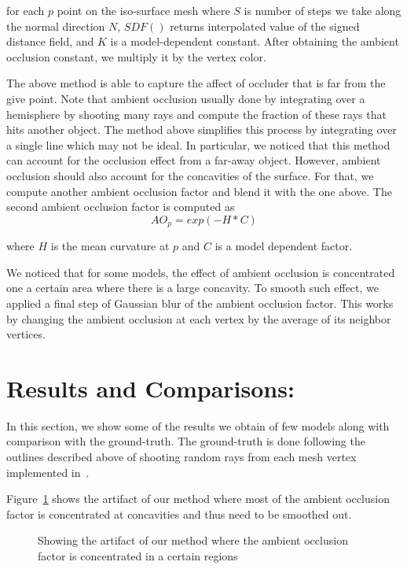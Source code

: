 \documentclass[a4paper,10pt]{article}
\begin{document}
for each $p$ point on the iso-surface mesh where $S$ is number of steps we take along the normal direction $N$,  $SDF()$ returns interpolated value of the signed distance field, and $K$ is a model-dependent constant. After obtaining the ambient occlusion constant, we multiply it by the vertex color. 



The above method is able to capture the affect of occluder that is far from the give point. Note that ambient occlusion usually done by integrating over a hemisphere by shooting many rays and compute the fraction of these rays that hits another object. The method above simplifies this process by integrating over a single line which may not be ideal. In particular, we noticed that this method can account for the occlusion effect from a far-away object. However, ambient occlusion should also account for the concavities of the surface. For that, we compute another ambient occlusion factor and blend it with the one above. The second ambient occlusion factor is computed as 
$$
AO_{p} = exp(-H*C)
$$

where $H$ is the mean curvature at $p$ and $C$ is a model dependent factor. 

We noticed that for some models, the effect of ambient occlusion is concentrated one a certain area where there is a large concavity. To smooth such effect, we applied a final step of Gaussian blur of the ambient occlusion factor. This works by changing the ambient occlusion at each vertex by the average of its neighbor vertices. 

\section{Results and Comparisons:}
In this section, we show some of the results we obtain of few models along with comparison with the ground-truth. The ground-truth is done following the outlines described above of shooting random rays from each mesh vertex implemented in~\citep{libigl}. 

Figure~\ref{fig:curv} shows the artifact of our method where most of the ambient occlusion factor is concentrated at concavities and thus need to be smoothed out.


\begin{figure}[!tbh]
\centering        
   \caption{Showing the artifact of our method where the ambient occlusion factor is concentrated in a certain regions}
   \label{fig:curv}
\end{figure}
\end{document}
